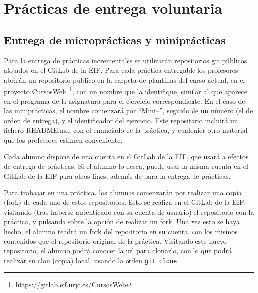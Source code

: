 



\section{Prácticas de entrega voluntaria}

\subsection{Entrega de microprácticas y miniprácticas}
\label{sec:eje-entrega-practicas-incr}

Para la entrega de prácticas incrementales se utilizarán repositorios git públicos alojados en el GitLab de la EIF. Para cada práctica entregable los profesores abrirán un repositorio público en la carpeta de plantillas del curso actual, en el proyecto CursosWeb~\footnote{\url{https://gitlab.eif.urjc.es/CursosWeb}}, con un nombre que la identifique, similar al que aparece en el programa de la asignatura para el ejercicio correspondiente. En el caso de las miniprácticas, el nombre comenzará por ``Mini--'', seguido de un número (el de orden de entrega), y el identificador del ejercicio. Este repositorio incluirá un fichero README.md, con el enunciado de la práctica, y cualquier otro material que los profesores estimen conveniente.

Cada alumno dispone de una cuenta en el GitLab de la EIF, que usará a efectos de entrega de prácticas. Si el alumno lo desea, puede usar la misma cuenta en el GitLab de la EIF para otros fines, además de para la entrega de prácticas.

Para trabajar en una práctica, los alumnos comenzarán por realizar una copia (fork) de cada uno de estos repositorios. Esto se realiza en el GitLab de la EIF, visitando (tras haberse autenticado con su cuenta de usuario) el repositorio con la práctica, y pulsando sobre la opción de realizar un fork. Una vez esto se haya hecho, el alumno tendrá un fork del repositorio en su cuenta, con los mismos contenidos que el repositorio original de la práctica. Visitando este nuevo repositorio, el alumno podrá conocer la url para clonarlo, con lo que podrá realizar su clon (copia) local, usando la orden \verb|git clone|.

